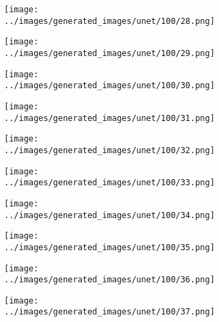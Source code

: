 \begin{figure}[H]
\begin{subfigure}[b]{0.1\textwidth}
 \texttt{[image: ../images/generated\_images/unet/100/28.png]}
\end{subfigure}
\hspace{1em}%
\begin{subfigure}[b]{0.1\textwidth}
\centering
\texttt{[image: ../images/generated\_images/unet/100/29.png]}
\end{subfigure}
\hspace{1em}%
\begin{subfigure}[b]{0.1\textwidth}
\centering
\texttt{[image: ../images/generated\_images/unet/100/30.png]}
\end{subfigure}
\hspace{1em}%
\begin{subfigure}[b]{0.1\textwidth}
\centering
\texttt{[image: ../images/generated\_images/unet/100/31.png]}
\end{subfigure}
\hspace{1em}%
\begin{subfigure}[b]{0.1\textwidth}
\centering
\texttt{[image: ../images/generated\_images/unet/100/32.png]}
\end{subfigure}
\hspace{1em}%
\begin{subfigure}[b]{0.1\textwidth}
\centering
\texttt{[image: ../images/generated\_images/unet/100/33.png]}
\end{subfigure}
\hspace{1em}%
\begin{subfigure}[b]{0.1\textwidth}
\centering
\texttt{[image: ../images/generated\_images/unet/100/34.png]}
\end{subfigure}
\hspace{1em}%
\begin{subfigure}[b]{0.1\textwidth}
\centering
\texttt{[image: ../images/generated\_images/unet/100/35.png]}
\end{subfigure}
\hspace{1em}%
\begin{subfigure}[b]{0.1\textwidth}
\centering
\texttt{[image: ../images/generated\_images/unet/100/36.png]}
\end{subfigure}
\hspace{1em}%
\begin{subfigure}[b]{0.1\textwidth}
\centering
\texttt{[image: ../images/generated\_images/unet/100/37.png]}
\end{subfigure}

\end{figure}
